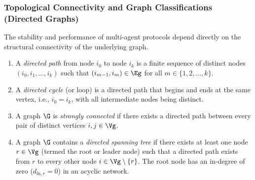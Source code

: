 \subsubsection{Topological Connectivity and Graph Classifications (Directed Graphs)}
The stability and performance of multi-agent protocols depend directly on the structural connectivity of the underlying graph. 
\begin{definition}\label{def:paths_cycles}
\leavevmode\par\noindent
\begin{enumerate}
    \item A \emph{directed path} from node $i_0$ to node $i_k$ is a finite sequence of distinct nodes $(i_0, i_1, \dots, i_k)$ such that $(i_{m-1}, i_m) \in \Eg$ for all $m \in \{1, 2, \dots, k\}$.
    \item A \emph{directed cycle} (or loop) is a directed path that begins and ends at the same vertex, i.e., $i_0 = i_k$, with all intermediate nodes being distinct.
    \item A graph $\G$ is \emph{strongly connected} if there exists a directed path between every pair of distinct vertices $i, j \in \Vg$.
    \item A graph $\G$ contains a \emph{directed spanning tree} if there exists at least one node $r \in \Vg$ (termed the root or leader node) such that a directed path exists from $r$ to every other node $i \in \Vg \setminus \{r\}$. The root node has an in-degree of zero ($d_{\text{in}, r} = 0$) in an acyclic network.
\end{enumerate}
\end{definition}

